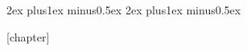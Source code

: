 \makeatletter
{}
\makeatother

\usepackage[fixamsmath,disallowspaces]{mathtools}

\usepackage{fixmath}

\usepackage{framed} %
\usepackage[amsmath,hyperref,framed]{ntheorem} %
\theorempreskipamount 2ex plus1ex minus0.5ex
\theorempostskipamount 2ex plus1ex minus0.5ex
\theoremstyle{break}
\theoremheaderfont{\normalfont\bfseries}
\theorembodyfont{\normalfont}
\newcommand{\definitionframe}[1]{{\color{black!45}\vrule width 2pt}\colorbox{black!4}{#1}}
\def\theoremframecommand{\definitionframe}
[chapter]




